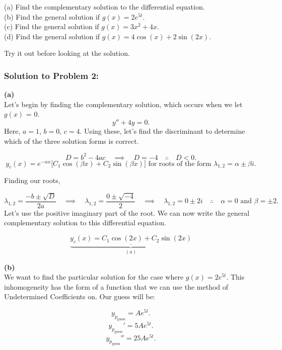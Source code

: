 \documentclass[a4paper,12pt]{article} %
\begin{document}
(a) Find the complementary solution to the differential equation.\\

(b) Find the general solution if $g(x) = 2e^{5t}$.\\

(c) Find the general solution if $g(x) = 3x^2 + 4x$.\\

(d) Find the general solution if $g(x) = 4\cos(x) + 2\sin(2x)$.\\

\vspace{.5in}
 
Try it out before looking at the solution.
\pagebreak
 
 \subsubsection*{Solution to Problem 2:}

\textbf{(a)}\\
Let's begin by finding the complementary solution, which occurs when we let $g(x)$ = 0.
$$ y'' + 4y = 0. $$
Here, $a = 1$, $b=0$, $c=4$. Using these, let's find the discriminant to determine which of the three solution forms is correct.

$$ D = b^2 - 4ac \quad\implies\quad D = -4 \quad\therefore\quad D<0.$$
$$ y_c(x) = e^{-\alpha x}\bigg[C_1\cos{(\beta x) + C_2\sin{(\beta x)}}\bigg] \text{ for roots of the form } \lambda_{1,2} = \alpha \pm \beta i.$$

Finding our roots,

$$ \lambda_{1,2} = \frac{-b \pm \sqrt{D}}{2a} \quad\implies\quad \lambda_{1,2} = \frac{0 \pm \sqrt{-4}}{2} \quad\implies\quad \lambda_{1,2} = 0 \pm 2i\quad\therefore\quad \alpha = 0 \text{ and }\beta = \pm 2.$$
Let's use the positive imaginary part of the root. We can now write the general complementary solution to this differential equation.

$$ \underbrace{\underline{\boxed{y_c(x) = C_1\cos{(2x)} + C_2\sin{(2x)}}}}_{(a)} $$

\textbf{(b)}\\
We want to find the particular solution for the case where $g(x) = 2e^{5t}$. This inhomogeneity has the form of a function that we can use the method of Undetermined Coefficients on. Our guess will be:

$$ y_{p_{\text{guess}}} = Ae^{5t}. $$
$$ y_{p_{\text{guess}}}' = 5Ae^{5t}. $$
$$ y_{p_{\text{guess}}}'' = 25Ae^{5t}. $$
\end{document}
